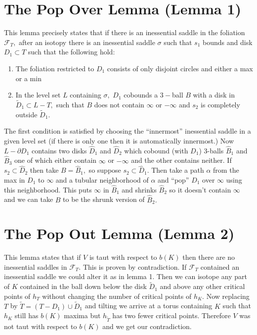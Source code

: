 \documentclass[11pt, oneside]{article}
\begin{document}
\section*{The Pop Over Lemma (Lemma 1)}
This lemma precisely states that if there is an inessential saddle in the foliation $\mathcal{F}_{T},$ after an isotopy there is an inessential saddle $\sigma$ such that $s_{1}$ bounds and disk $D_{1} \subset T$ such that the following hold:
\begin{enumerate}
\item The foliation restricted to $D_{1}$ consists of only disjoint circles and either a max or a min
\item In the level set $L$ containing $\sigma,$ $D_{1}$ cobounds a $3-$ball $B$ with a disk in $\tilde{D}_{1} \subset L - T,$ such that $B$ does not contain $\infty$ or $-\infty$ and $s_{2}$ is completely outside $\tilde{D}_{1}.$
\end{enumerate} The first condition is satisfied by choosing the ``innermost'' inessential saddle in a given level set (if there is only one then it is automatically innermost.) Now $L - \partial D_{1}$ contains two disks $\hat{D}_{1}$ and $\hat{D}_{2}$ which cobound (with $D_{1}$) 3-balls $\hat{B}_{1}$ and $\hat{B}_{3}$ one of which either contain $\infty$ or $-\infty$ and the other contains neither. If $s_{2} \subset \hat{D}_{2}$ then take $B = \hat{B}_{1},$ so suppose $s_{2} \subset \hat{D}_{1}.$ Then take a path $\alpha$ from the max in $D_{1}$ to $\infty$ and a tubular neighborhood of $\alpha$ and ``pop'' $D_{1}$ over $\infty$ using this neighborhood. This puts $\infty$ in $\hat{B}_{1}$ and shrinks $\hat{B}_{2}$ so it doesn't contain $\infty$ and we can take $B$ to be the shrunk version of $\hat{B}_{2}.$  



\section*{The Pop Out Lemma (Lemma 2)}
This lemma states that if $V$ is taut with respect to $b(K)$ then there are no inessential saddles in $\mathcal{F}_{T}.$ \newline \newline This is proven by contradiction. If $\mathcal{F}_{T}$ contained an inessential saddle we could alter it as in lemma 1. Then we can isotope any part of $K$ contained in the ball down below the disk $\tilde{D}_{1}$ and above any other critical points of $h_{T}$ without changing the number of critical points of $h_{K}.$ Now replacing $T$ by $\tilde{T} = (T - D_{1}) \cup \tilde{D}_{1}$ and tilting  we arrive at a torus containing $K$ such that $h_{K}$ still has $b(K)$ maxima but $h_{\tilde{T}}$ has two fewer critical points. Therefore $V$ was not taut with respect to $b(K)$ and we get our contradiction.
\end{document}
